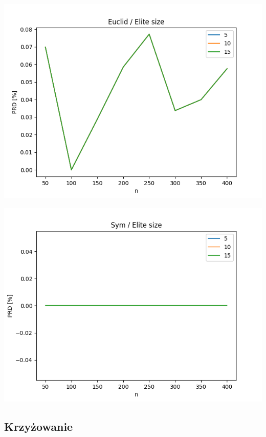 \documentclass{article}
\begin{document}
\begin{center}
\includegraphics[width=\textwidth, 
                   height = 0.4\textheight, 
                   keepaspectratio]
                  {plots/euclid_4_elite_num} 
\end{center}

\begin{center}
\includegraphics[width=\textwidth, 
                   height = 0.4\textheight, 
                   keepaspectratio]
                  {plots/sym_4_elite_num} 
\end{center}


\subsection{Krzyżowanie}
\end{document}
